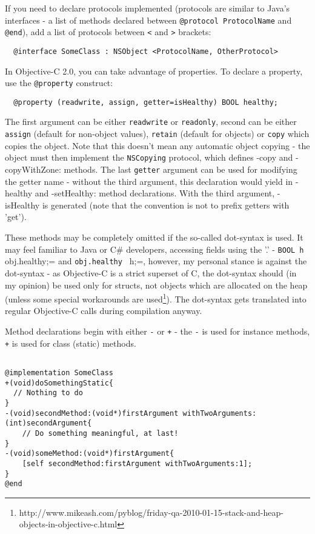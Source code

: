 \documentclass[a4paper, 11pt, fleqn]{book}
\begin{document}
If you need to declare protocols implemented (protocols are similar to Java's interfaces - a list of methods declared between \verb=@protocol ProtocolName= and \verb=@end=), add a list of protocols between \verb=<= and \verb=>= brackets:

\begin{verbatim}
  @interface SomeClass : NSObject <ProtocolName, OtherProtocol>
\end{verbatim}

In Objective-C 2.0, you can take advantage of properties. To declare a property, use the \verb=@property= construct:

\begin{verbatim}
  @property (readwrite, assign, getter=isHealthy) BOOL healthy;
\end{verbatim}

The first argument can be either \verb=readwrite= or \verb=readonly=, second can be either \verb=assign= (default for non-object values), \verb=retain= (default for objects) or \verb=copy= which copies the object. Note that this doesn't mean any automatic object copying - the object must then implement the \verb=NSCopying= protocol, which defines -copy and -copyWithZone: methods. The last \verb=getter= argument can be used for modifying the getter name - without the third argument, this declaration would yield in -healthy and -setHealthy: method declarations. With the third argument, -isHealthy is generated (note that the convention is not to prefix getters with 'get'). 

These methods may be completely omitted if the so-called dot-syntax is used. It may feel familiar to Java or C# developers, accessing fields using the '.' - \verb=BOOL h = obj.healthy;= and \verb=obj.healthy = h;=, however, my personal stance is against the dot-syntax - as Objective-C is a strict superset of C, the dot-syntax should (in my opinion) be used only for structs, not objects which are allocated on the heap (unless some special workarounds are used\footnote{http://www.mikeash.com/pyblog/friday-qa-2010-01-15-stack-and-heap-objects-in-objective-c.html}). The dot-syntax gets translated into regular Objective-C calls during compilation anyway.

Method declarations begin with either \verb=-= or \verb=+= - the \verb=-= is used for instance methods, \verb=+= is used for class (static) methods.


\begin{verbatim}

@implementation SomeClass
+(void)doSomethingStatic{
  // Nothing to do
}
-(void)secondMethod:(void*)firstArgument withTwoArguments:(int)secondArgument{
    // Do something meaningful, at last!
}
-(void)someMethod:(void*)firstArgument{
    [self secondMethod:firstArgument withTwoArguments:1];
}
@end

\end{verbatim}
\end{document}
